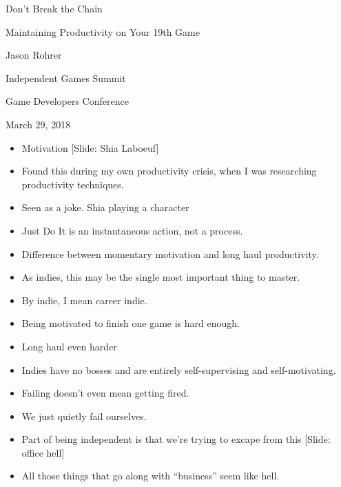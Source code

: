\documentclass[12pt]{article}
\begin{document}
\begin{center}
Don't Break the Chain

Maintaining Productivity on Your 19th Game 

Jason Rohrer

Independent Games Summit

Game Developers Conference 

March 29, 2018
\end{center}


{\Huge



\begin{itemize}

\item Motivation [Slide:  Shia Laboeuf]

\item Found this during my own productivity crisis, when I was researching productivity techniques.

\item Seen as a joke.  Shia playing a character

\item Just Do It is an instantaneous action, not a process.

\item Difference between momentary motivation and long haul productivity.

\item As indies, this may be the single most important thing to master.

\item By indie, I mean career indie.

\item Being motivated to finish one game is hard enough.

\item Long haul even harder

\item Indies have no bosses and are entirely self-supervising and self-motivating.

\item Failing doesn't even mean getting fired.  

\item We just quietly fail ourselves.

\item Part of being independent is that we're trying to excape from this [Slide:  office hell]

\item All those things that go along with ``business'' seem like hell.


\end{itemize}}
\end{document}
